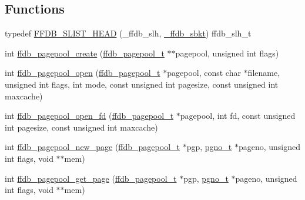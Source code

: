 \subsection*{Functions}
\begin{DoxyCompactItemize}
\item 
typedef \mbox{\hyperlink{adat-devel_2other__libs_2filedb_2filehash_2ffdb__pagepool_8h_aad811ff54987678d1dfde499c3ef4899}{F\+F\+D\+B\+\_\+\+S\+L\+I\+S\+T\+\_\+\+H\+E\+AD}} (\+\_\+ffdb\+\_\+slh, \mbox{\hyperlink{struct__ffdb__sbkt}{\+\_\+ffdb\+\_\+sbkt}}) ffdb\+\_\+slh\+\_\+t
\item 
int \mbox{\hyperlink{adat-devel_2other__libs_2filedb_2filehash_2ffdb__pagepool_8h_a942bc04bad183d386b22a85d5d070ffc}{ffdb\+\_\+pagepool\+\_\+create}} (\mbox{\hyperlink{adat-devel_2other__libs_2filedb_2filehash_2ffdb__pagepool_8h_a73290f737b0e5f8be90a0fa96ddf6ab6}{ffdb\+\_\+pagepool\+\_\+t}} $\ast$$\ast$pagepool, unsigned int flags)
\item 
int \mbox{\hyperlink{adat-devel_2other__libs_2filedb_2filehash_2ffdb__pagepool_8h_a12eb043ae26795fb94d776f0bb48eddf}{ffdb\+\_\+pagepool\+\_\+open}} (\mbox{\hyperlink{adat-devel_2other__libs_2filedb_2filehash_2ffdb__pagepool_8h_a73290f737b0e5f8be90a0fa96ddf6ab6}{ffdb\+\_\+pagepool\+\_\+t}} $\ast$pagepool, const char $\ast$filename, unsigned int flags, int mode, const unsigned int pagesize, const unsigned int maxcache)
\item 
int \mbox{\hyperlink{adat-devel_2other__libs_2filedb_2filehash_2ffdb__pagepool_8h_a1fb004ebd1f72e4fe64f32f150bc380e}{ffdb\+\_\+pagepool\+\_\+open\+\_\+fd}} (\mbox{\hyperlink{adat-devel_2other__libs_2filedb_2filehash_2ffdb__pagepool_8h_a73290f737b0e5f8be90a0fa96ddf6ab6}{ffdb\+\_\+pagepool\+\_\+t}} $\ast$pagepool, int fd, const unsigned int pagesize, const unsigned int maxcache)
\item 
int \mbox{\hyperlink{adat-devel_2other__libs_2filedb_2filehash_2ffdb__pagepool_8h_a64907f28abdad3f859641b235e76bb42}{ffdb\+\_\+pagepool\+\_\+new\+\_\+page}} (\mbox{\hyperlink{adat-devel_2other__libs_2filedb_2filehash_2ffdb__pagepool_8h_a73290f737b0e5f8be90a0fa96ddf6ab6}{ffdb\+\_\+pagepool\+\_\+t}} $\ast$pgp, \mbox{\hyperlink{adat-devel_2other__libs_2filedb_2filehash_2ffdb__db_8h_a000813331643d38481142bcce7de1501}{pgno\+\_\+t}} $\ast$pageno, unsigned int flags, void $\ast$$\ast$mem)
\item 
int \mbox{\hyperlink{adat-devel_2other__libs_2filedb_2filehash_2ffdb__pagepool_8h_a5b3c5e95803e8cb5f6eee48855f12f27}{ffdb\+\_\+pagepool\+\_\+get\+\_\+page}} (\mbox{\hyperlink{adat-devel_2other__libs_2filedb_2filehash_2ffdb__pagepool_8h_a73290f737b0e5f8be90a0fa96ddf6ab6}{ffdb\+\_\+pagepool\+\_\+t}} $\ast$pgp, \mbox{\hyperlink{adat-devel_2other__libs_2filedb_2filehash_2ffdb__db_8h_a000813331643d38481142bcce7de1501}{pgno\+\_\+t}} $\ast$pageno, unsigned int flags, void $\ast$$\ast$mem)
$$
\end{DoxyCompactItemize}
